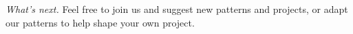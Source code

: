 \begin{framed}
\noindent \emph{What's next.}  Feel free to join us and suggest new patterns and
projects, or adapt our patterns to help shape your own
 project.
\end{framed}


\endgroup

